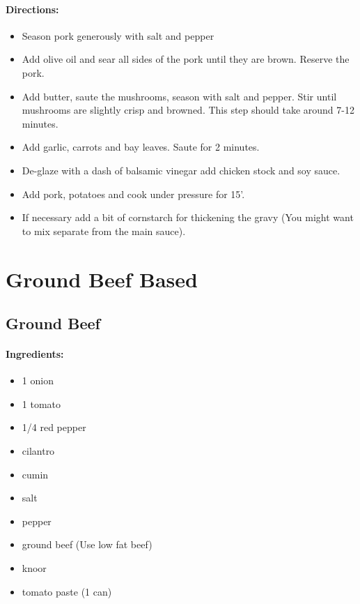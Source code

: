 \documentclass{article}
\begin{document}
\paragraph{Directions:}
\begin{itemize}
	\item Season pork generously with salt and pepper
	\item Add olive oil and sear all sides of the pork until they are brown. Reserve the pork.
	\item Add butter, saute the mushrooms, season with salt and pepper. Stir until mushrooms are slightly
	crisp and browned. This step should take around 7-12 minutes.
	\item Add garlic, carrots and bay leaves. Saute for 2 minutes.
	\item De-glaze with a dash of balsamic vinegar add chicken stock and soy sauce.
	\item Add pork, potatoes and cook under pressure for 15’.
	\item If necessary add a bit of cornstarch for thickening the gravy (You might want to mix separate from the
	main sauce).	
\end{itemize}

\section{Ground Beef Based}

\subsection{Ground Beef}

\paragraph{Ingredients:}

\begin{itemize}
	\item 1 onion 
	\item 1 tomato 
	\item 1/4 red pepper 
	\item cilantro 
	\item cumin 
	\item salt 
	\item pepper 
	\item ground beef (Use low fat beef) 
	\item knoor 
	\item tomato paste (1 can)
\end{itemize}
\end{document}
